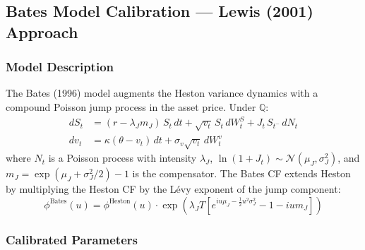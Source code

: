 \documentclass[12pt,a4paper]{article}
\begin{document}
\subsection{Bates Model Calibration --- Lewis (2001) Approach}
\label{sec:step2d}

\subsubsection{Model Description}

The Bates (1996) model augments the Heston variance dynamics with a compound Poisson jump process in the asset price. Under $\mathbb{Q}$:
\begin{align}
  dS_t &= (r - \lambda_J m_J)\,S_t\,dt + \sqrt{v_t}\,S_t\,dW_t^S + J_t\,S_{t^-}\,dN_t \\
  dv_t &= \kappa(\theta - v_t)\,dt + \sigma_v\sqrt{v_t}\,dW_t^v
\end{align}
where $N_t$ is a Poisson process with intensity $\lambda_J$, $\ln(1+J_t) \sim \mathcal{N}(\mu_J, \sigma_J^2)$, and $m_J = \exp(\mu_J + \sigma_J^2/2) - 1$ is the compensator. The Bates CF extends Heston by multiplying the Heston CF by the L\'evy exponent of the jump component:
\[
  \phi^{\text{Bates}}(u) = \phi^{\text{Heston}}(u)\cdot\exp\!\left(\lambda_J T\left[e^{i u\mu_J - \frac{1}{2}u^2\sigma_J^2} - 1 - iu m_J\right]\right)
\]

\subsubsection{Calibrated Parameters}
\end{document}
